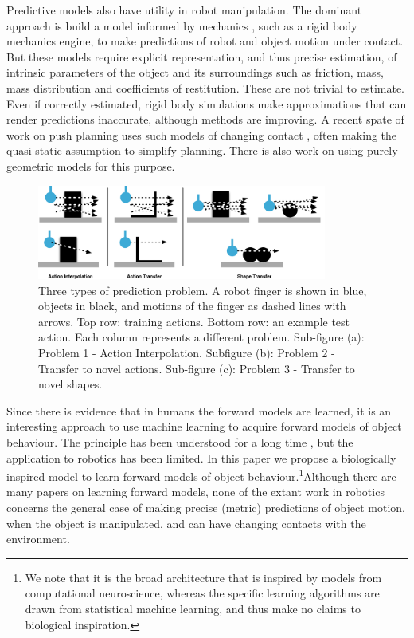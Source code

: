 Predictive models also have utility in robot manipulation. The dominant approach is build a model informed by mechanics \citep{mason_manipulator_1982,lynch_mechanics_1992,peshkin_motion_1988,cappelleri_designing_2006,mason_mechanics_2001,flickinger2015}, such as a rigid body mechanics engine, to make predictions of robot and object motion under contact. But these models require explicit representation, and thus precise estimation, of intrinsic parameters of the object and its surroundings such as friction, mass, mass distribution and coefficients of restitution. These are not trivial to estimate. Even if correctly estimated, rigid body simulations make approximations that can render predictions inaccurate, although methods are improving. A recent spate of work on push planning uses such models of changing contact \citep{Dogar_2010,zitoetal-iros12,Cosgun2011}, often making the quasi-static assumption to simplify planning. There is also work on using purely geometric models \citep{stillman08ijrr} for this purpose.

\def\stackalignment{l}
\begin{figure}[t]
\centerline{\includegraphics[width=0.85\textwidth]{three-prediction-problems}}
\caption{Three types of prediction problem. A robot finger is shown in blue, objects in black, and motions of the finger as dashed lines with arrows. Top row: training actions. Bottom row: an example test action. Each column represents a different problem. Sub-figure (a): Problem 1 - Action Interpolation. Subfigure (b): Problem 2 - Transfer to novel actions. Sub-figure (c): Problem 3 - Transfer to novel shapes. \label{fig:three-prediction-problems}}
\end{figure}

Since there is evidence that in humans the forward models are learned, it is an interesting approach to use machine learning to acquire forward models of object behaviour. The principle has been understood for a long time \citep{JordanJacobs90,JordanRumelhart92}, but the application to robotics has been limited. In this paper we propose a biologically inspired model to learn forward models of object behaviour.\footnote{We note that it is the broad architecture that is inspired by models from computational neuroscience, whereas the specific learning algorithms are drawn from statistical machine learning, and thus make no claims to biological inspiration.}Although there are many papers on learning forward models, none of the extant work in robotics concerns the general case of making precise (metric) predictions of object motion, when the object is manipulated, and can have changing contacts with the environment.
